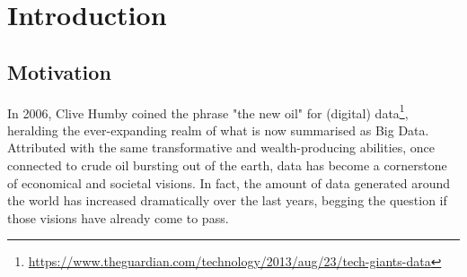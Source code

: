 \documentclass[a4paper,english,twoside,BCOR1.5cm,headsepline,DIV12,appendixprefix,final,12pt]{scrbook}
\newcommand\footnoteurl[1]{\footnote{\scriptsize\url{#1}}}
\begin{document}

\frenchspacing

\mainmatter

\chapter{Introduction}
\label{chap:introduction}

\section{Motivation}
\label{sec:motivation}
In 2006, Clive Humby coined the phrase "the new oil" for (digital) data\footnoteurl{https://www.theguardian.com/technology/2013/aug/23/tech-giants-data}, heralding the ever-expanding realm of what is now summarised as Big Data. Attributed with the same transformative and wealth-producing abilities, once connected to crude oil bursting out of the earth, data has become a cornerstone of economical and societal visions. In fact, the amount of data generated around the world has increased dramatically over the last years, begging the question if those visions have already come to pass. 
\end{document}
